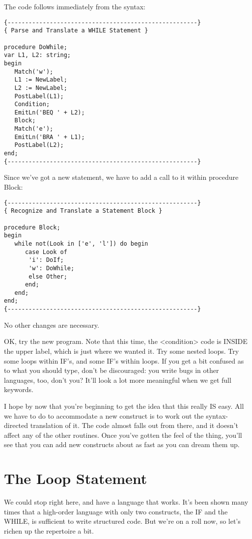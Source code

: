 The code follows immediately from the syntax:

\begin{verbatim}
{------------------------------------------------------}
{ Parse and Translate a WHILE Statement }

procedure DoWhile;
var L1, L2: string;
begin
   Match('w');
   L1 := NewLabel;
   L2 := NewLabel;
   PostLabel(L1);
   Condition;
   EmitLn('BEQ ' + L2);
   Block;
   Match('e');
   EmitLn('BRA ' + L1);
   PostLabel(L2);
end;
{------------------------------------------------------}
\end{verbatim}

Since  we've  got a new statement, we have to add a  call  to  it within procedure Block:

\begin{verbatim}
{------------------------------------------------------}
{ Recognize and Translate a Statement Block }

procedure Block;
begin
   while not(Look in ['e', 'l']) do begin
      case Look of
       'i': DoIf;
       'w': DoWhile;
       else Other;
      end;
   end;
end;
{------------------------------------------------------}
\end{verbatim}

No other changes are necessary.

OK, try the new program. Note that this  time, the  <condition> code is INSIDE the upper label, which is just where we wanted it. Try some nested loops. Try some loops within IF's, and some IF's within loops. If you get  a  bit  confused as to what you should type, don't be discouraged:  you  write  bugs in other languages, too, don't you?  It'll look a lot  more  meaningful  when  we get full keywords.

I hope by now that you're beginning to  get  the  idea  that this really  IS easy. All we have to do to accommodate a new construct is to work out  the  syntax-directed translation of it. The code almost falls out  from  there, and  it doesn't affect any of the other routines. Once you've gotten the feel of the thing, you'll see that you  can  add  new  constructs  about as fast as you can dream them up.

\section{The Loop Statement}

We could stop right here, and  have  a language that works. It's been  shown  many  times that a high-order language with only two constructs, the IF and the WHILE, is sufficient  to  write structured  code. But we're on a roll now, so let's richen up  the repertoire a bit.

